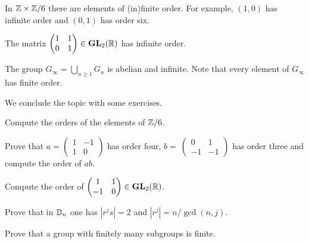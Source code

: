  \begin{example}
        In $\mathbb{Z}\times\mathbb{Z}/6$ there are elements of 
        (in)finite order. For example, $(1,0)$ 
        has infinite order and 
        $(0,1)$ has order six. 
 \end{example}
                        
\begin{example}
        The matrix $\begin{pmatrix}1&1\\0&1\end{pmatrix}\in\mathbf{GL}_2(\mathbb{R})$ has infinite order.
\end{example}                     
                                
\begin{example}
        The group $G_\infty=\bigcup_{n\geq1}G_n$ is abelian and infinite. Note that every element of 
        $G_\infty$ has finite order. 
\end{example}
          
We conclude the topic with some exercises. 

\begin{exercise}
        Compute the orders of the elements of $\mathbb{Z}/6$.
\end{exercise}       

\begin{exercise}
        Prove that $a=\begin{pmatrix}1&-1\\1&0\end{pmatrix}$ has order four, $b=\
        \begin{pmatrix}0&1\\-1&-1\end{pmatrix}$ has order three and 
        compute the order of $ab$.%
\end{exercise}
                                
\begin{exercise}
        Compute the order of 
        $\begin{pmatrix}1&1\\-1&0\end{pmatrix}\in\mathbf{GL}_2(\mathbb{R})$.
\end{exercise}
                                
\begin{exercise}
        Prove that in $\mathbb{D}_n$ one has 
        $|r^js|=2$ and $|r^j|=n/\gcd(n,j)$.
\end{exercise}
                                
\begin{exercise}
        Prove that a group with finitely many subgroups
        is finite. 
\end{exercise}



